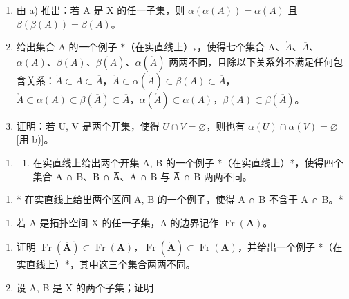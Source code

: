 \begin{enumerate}
\def\labelenumi{\alph{enumi})}
\setcounter{enumi}{1}
\item
  由 a) 推出：若 A 是 X 的任一子集，则 \(\alpha(\alpha(A)) = \alpha(A)\) 且 \(\beta(\beta(A)) = \beta(A)\)。
\item
  给出集合 A 的一个例子 \(*\)（在实直线上）\(_{*}\)，使得七个集合 A、\(\mathring{A}\)、\(\overline{A}\)、\(\alpha(A)\)、\(\beta(A)\)、\(\beta(\overline{A})\)、\(\alpha(\mathring{A})\) 两两不同，且除以下关系外不满足任何包含关系：\(\mathring{A} \subset A \subset \overline{A}\)，\(\mathring{A} \subset \alpha(\mathring{A}) \subset \beta(A) \subset \overline{A}\)，\(\mathring{A} \subset \alpha(A) \subset \beta(\overline{A}) \subset \overline{A}\)，\(\alpha(\mathring{A}) \subset \alpha(A)\)，\(\beta(A) \subset \beta(\overline{A})\)。
\item
  证明：若 U, V 是两个开集，使得 \(U \cap V = \varnothing\)，则也有 \(\alpha(U) \cap \alpha(V) = \varnothing\) {[}用 b){]}。
\end{enumerate}

\begin{enumerate}
\def\labelenumi{\arabic{enumi})}
\setcounter{enumi}{3}
\tightlist
\item
  \begin{enumerate}
  \def\labelenumii{\alph{enumii})}
  \tightlist
  \item
    在实直线上给出两个开集 A, B 的一个例子 *（在实直线上）*，使得四个集合 A ∩ B、B ∩ A̅、A ∩ B 与 A̅ ∩ B 两两不同。
  \end{enumerate}
\end{enumerate}

\begin{enumerate}
\def\labelenumi{\alph{enumi})}
\setcounter{enumi}{1}
\tightlist
\item
  * 在实直线上给出两个区间 A, B 的一个例子，使得 A ∩ B 不含于 A ∩ B。*
\end{enumerate}

\begin{enumerate}
\def\labelenumi{\arabic{enumi})}
\setcounter{enumi}{4}
\tightlist
\item
  若 A 是拓扑空间 X 的任一子集，A 的边界记作 \(\operatorname{Fr}(\mathbf{A})\)。
\end{enumerate}

\begin{enumerate}
\def\labelenumi{\alph{enumi})}
\item
  证明 \(\operatorname{Fr}(\overline{\mathbf{A}}) \subset \operatorname{Fr}(\mathbf{A})\)，\(\operatorname{Fr}(\mathring{\mathbf{A}}) \subset \operatorname{Fr}(\mathbf{A})\)，并给出一个例子 *（在实直线上）*，其中这三个集合两两不同。
\item
  设 A, B 是 X 的两个子集；证明
\end{enumerate}

